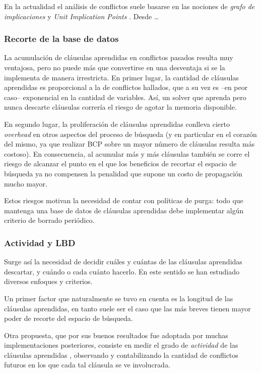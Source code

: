 En la actualidad el análisis de conflictos suele basarse en las nociones de \emph{grafo de implicaciones} y \emph{Unit Implication Points} \cite{marques-silva:iccad96}. Desde \ldots


\subsubsection{Recorte de la base de datos}

La acumulación de cláusulas aprendidas en conflictos pasados resulta muy ventajosa, pero no puede más que convertirse en una desventaja si se la implementa de manera irrestricta. En primer lugar, la cantidad de cláusulas aprendidas es proporcional a la de conflictos hallados, que a su vez es --en peor caso-- exponencial en la cantidad de variables. Así, un solver que aprenda pero nunca descarte cláusulas correría el riesgo de agotar la memoria disponible.

En segundo lugar, la proliferación de cláusulas aprendidas conlleva cierto \emph{overhead} en otros aspectos del proceso de búsqueda (y en particular en el corazón del mismo, ya que realizar BCP sobre un mayor número de cláusulas resulta más costoso). En consecuencia, al acumular más y más cláusulas también se corre el riesgo de alcanzar el punto en el que los beneficios de recortar el espacio de búsqueda ya no compensen la penalidad que supone un costo de propagación mucho mayor.

Estos riesgos motivan la necesidad de contar con políticas de purga: todo \ssolver que mantenga una base de datos de cláusulas aprendidas debe implementar algún criterio de borrado periódico.



\subsubsection{Actividad y LBD}

Surge así la necesidad de decidir cuáles y cuántas de las cláusulas aprendidas descartar, y cuándo o cada cuánto hacerlo. En este sentido se han estudiado diversos enfoques y criterios.

Un primer factor que naturalmente se tuvo en cuenta es la longitud de las cláusulas aprendidas, en tanto suele ser el caso \cite{marques-silva:iccad96} que las más breves tienen mayor poder de recorte del espacio de búsqueda.

Otra propuesta, que por sus buenos resultados fue adoptada por muchas implementaciones posteriores, consiste en medir el grado de \emph{actividad} de las cláusulas aprendidas \cite{goldberg:date02}, observando y contabilizando la cantidad de conflictos futuros en los que cada tal cláusula se ve involucrada.


